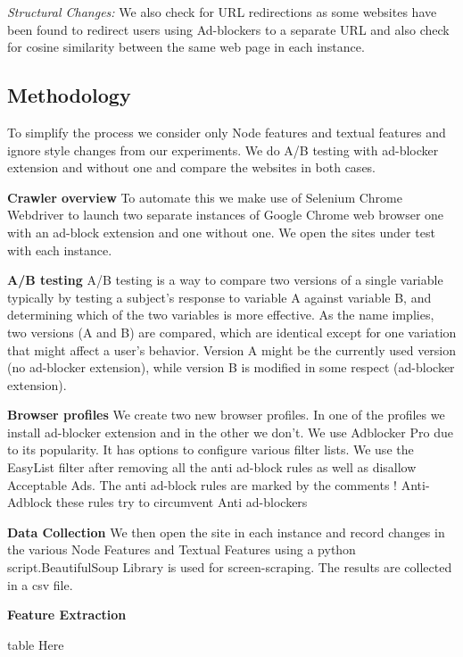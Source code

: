 \documentclass[runningheads,a4paper]{llncs}
\begin{document}
\textit{Structural Changes:} We also check for URL redirections as some websites have been found to redirect users using Ad-blockers to a separate URL and also check for cosine similarity between the same web page in each instance.

\subsection{Methodology}

To simplify the process we consider only Node features and textual features and ignore style changes from our experiments.
We do A/B testing with ad-blocker extension and without one and compare the websites in both cases.

\textbf{Crawler overview}
To automate this we make use of Selenium Chrome Webdriver \cite{Chrome Webdriver} to launch two separate instances of Google Chrome web browser one with an ad-block extension and one without one. We open the sites under test with each instance.
            
\textbf{A/B testing}
A/B testing is a way to compare two versions of a single variable typically by testing a subject's response to variable A against variable B, and determining which of the two variables is more effective. As the name implies, two versions (A and B) are compared, which are identical except for one variation that might affect a user's behavior. Version A might be the currently used version (no ad-blocker extension), while version B is modified in some respect (ad-blocker extension).\cite{AB testing}
            
\textbf{Browser profiles}
We create two new browser profiles. In one of the profiles we install ad-blocker extension and in the other we don't. We use Adblocker Pro due to its popularity. It has options to configure various filter lists. We use the EasyList filter \cite{easyList} after removing all the anti ad-block rules as well as disallow Acceptable Ads. The anti ad-block rules are marked by the comments ! Anti-Adblock these rules try to circumvent Anti ad-blockers
        
\textbf{Data Collection}
We then open the site in each instance and record changes in the various Node Features and Textual Features using a python script.BeautifulSoup Library is used for screen-scraping. The results are collected in a csv file.
           
\textbf{Feature Extraction}

table Here
\end{document}
